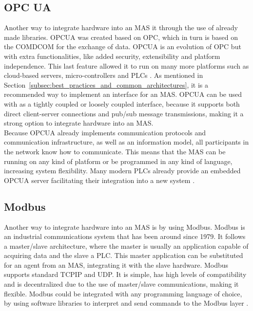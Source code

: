 \subsection{OPC UA}
\label{subsec:opcua}



Another way to integrate hardware into an \gls{MAS} it through the use of already made libraries. \gls{OPCUA} was created based on \gls{OPC}, which in turn is based on the \gls{COMDCOM} for the exchange of data. \gls{OPCUA} is an evolution of \gls{OPC} but with extra functionalities, like added security, extensibility and platform independence. This last feature allowed it to run on many more platforms such as cloud-based servers, micro-controllers and \gls{PLC}s \cite{OPCUA_website}. As mentioned in Section~\ref{subsec:best_practices_and_common_architectures}, it is a recommended way to implement an interface for an \gls{MAS}. \gls{OPCUA} can be used with as a tightly coupled or loosely coupled interface, because it supports both direct client-server connections and pub/sub message transmissions, making it a strong option to integrate hardware into an \gls{MAS}.\\

Because \gls{OPCUA} already implements communication protocols and communication infrastructure, as well as an information model, all participants in the network know how to communicate. This means that the \gls{MAS} can be running on any kind of platform or be programmed in any kind of language, increasing system flexibility. Many modern \gls{PLC}s already provide an embedded \gls{OPCUA} server facilitating their integration into a new system \cite{Seitz2021}.

\subsection{Modbus}

Another way to integrate hardware into an \gls{MAS} is by using Modbus. Modbus is an industrial communications system that has been around since 1979. It follows a master/slave architecture, where the master is usually an application capable of acquiring data and the slave a \gls{PLC}. This master application can be substituted for an agent from an \gls{MAS}, integrating it with the slave hardware. Modbus supports standard \gls{TCPIP} and \gls{UDP}. It is simple, has high levels of compatibility and is decentralized due to the use of master/slave communications, making it flexible. Modbus could be integrated with any programming language of choice, by using software libraries to interpret and send commands to the Modbus layer \cite{10084891}.
